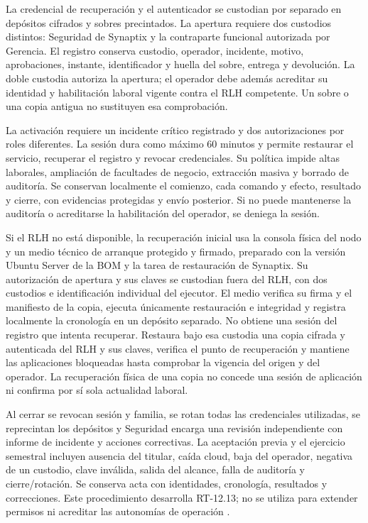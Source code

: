 La credencial de recuperación y el autenticador se custodian por separado en depósitos cifrados y sobres precintados. La apertura requiere dos custodios distintos: Seguridad de Synaptix y la contraparte funcional autorizada por Gerencia. El registro conserva custodio, operador, incidente, motivo, aprobaciones, instante, identificador y huella del sobre, entrega y devolución. La doble custodia autoriza la apertura; el operador debe además acreditar su identidad y habilitación laboral vigente contra el RLH competente. Un sobre o una copia antigua no sustituyen esa comprobación.

La activación requiere un incidente crítico registrado y dos autorizaciones por roles diferentes. La sesión dura como máximo 60 minutos y permite restaurar el servicio, recuperar el registro y revocar credenciales. Su política impide altas laborales, ampliación de facultades de negocio, extracción masiva y borrado de auditoría. Se conservan localmente el comienzo, cada comando y efecto, resultado y cierre, con evidencias protegidas y envío posterior. Si no puede mantenerse la auditoría o acreditarse la habilitación del operador, se deniega la sesión.

Si el RLH no está disponible, la recuperación inicial usa la consola física del nodo y un medio técnico de arranque protegido y firmado, preparado con la versión Ubuntu Server de la BOM y la tarea de restauración de Synaptix. Su autorización de apertura y sus claves se custodian fuera del RLH, con dos custodios e identificación individual del ejecutor. El medio verifica su firma y el manifiesto de la copia, ejecuta únicamente restauración e integridad y registra localmente la cronología en un depósito separado. No obtiene una sesión del registro que intenta recuperar. Restaura bajo esa custodia una copia cifrada y autenticada del RLH y sus claves, verifica el punto de recuperación y mantiene las aplicaciones bloqueadas hasta comprobar la vigencia del origen y del operador. La recuperación física de una copia no concede una sesión de aplicación ni confirma por sí sola actualidad laboral.

Al cerrar se revocan sesión y familia, se rotan todas las credenciales utilizadas, se reprecintan los depósitos y Seguridad encarga una revisión independiente con informe de incidente y acciones correctivas. La aceptación previa y el ejercicio semestral incluyen ausencia del titular, caída cloud, baja del operador, negativa de un custodio, clave inválida, salida del alcance, falla de auditoría y cierre/rotación. Se conserva acta con identidades, cronología, resultados y correcciones. Este procedimiento desarrolla RT-12.13; no se utiliza para extender permisos ni acreditar las autonomías de operación \parencite[RT-12.02/07/08, p.~25; RT-12.10/13, p.~26]{pucv-transversal}.
